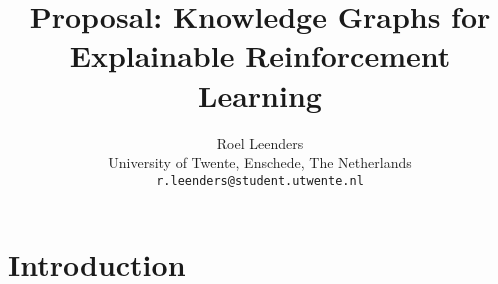 \documentclass[11pt]{article}
\title{Proposal: Knowledge Graphs for Explainable Reinforcement Learning}
\author{Roel Leenders \\
  University of Twente, Enschede, The Netherlands \\
  \texttt{r.leenders@student.utwente.nl}}
\begin{document}
\maketitle

\section{Introduction}



\end{document}
